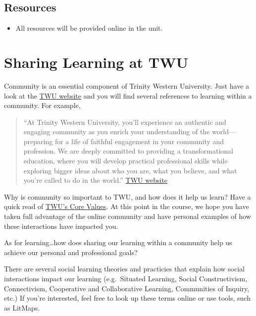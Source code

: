 \documentclass[
]{book}
\providecommand{\tightlist}{%
  \setlength{\itemsep}{0pt}\setlength{\parskip}{0pt}}
\theoremstyle{definition}
\theoremstyle{definition}
\theoremstyle{definition}
\theoremstyle{definition}
\theoremstyle{remark}
\begin{document}
\hypertarget{resources-5}{%
\subsection*{Resources}\label{resources-5}}

\begin{itemize}
\tightlist
\item
  All resources will be provided online in the unit.
\end{itemize}

\hypertarget{sharing-learning-at-twu}{%
\section{Sharing Learning at TWU}\label{sharing-learning-at-twu}}

Community is an essential component of Trinity Western University. Just have a look at the \href{https://www.twu.ca/}{TWU website} and you will find several references to learning within a community. For example,

\begin{quote}
``At Trinity Western University, you'll experience an authentic and engaging community as you enrich your understanding of the world---preparing for a life of faithful engagement in your community and profession. We are deeply committed to providing a transformational education, where you will develop practical professional skills while exploring bigger ideas about who you are, what you believe, and what you're called to do in the world.'' \href{https://www.twu.ca/}{TWU website}
\end{quote}

Why is community so important to TWU, and how does it help us learn? Have a quick read of \href{https://www.twu.ca/about-us/commitments/core-values}{TWU's Core Values}. At this point in the course, we hope you have taken full advantage of the online community and have personal examples of how these interactions have impacted you.

As for learning\ldots how does sharing our learning within a community help us achieve our personal and professional goals?

There are several social learning theories and practicies that explain how social interactions impact our learning (e.g.~Situated Learning, Social Constructivism, Connectivism, Cooperative and Collaborative Learning, Communities of Inquiry, etc.) If you're interested, feel free to look up these terms online or use tools, such as LitMaps.
\end{document}

